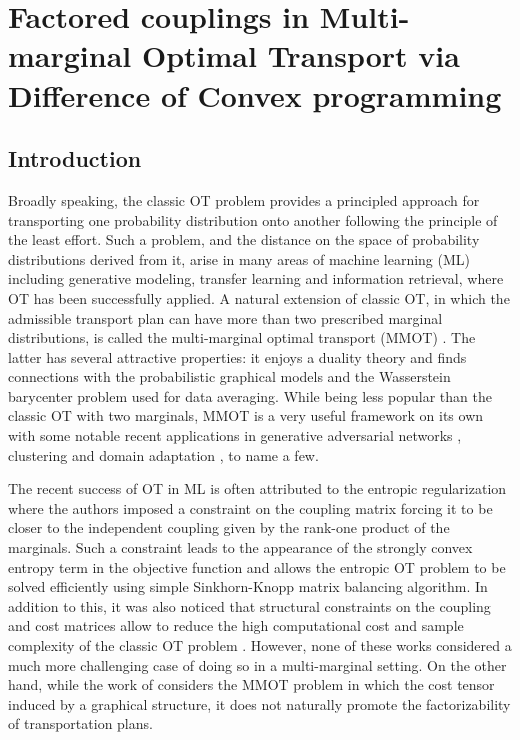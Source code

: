 \section{Factored couplings in Multi-marginal Optimal
Transport via Difference of Convex programming} \label{subsec:MMOT_DC}

\subsection{Introduction}

Broadly speaking, the classic OT problem provides a principled approach for transporting one probability distribution onto another
following the principle of the least effort. Such a problem, and the distance on the space of probability distributions derived from it,
arise in many areas of machine learning (ML) including generative modeling, transfer learning and information retrieval, where OT has
been successfully applied. A natural extension of classic OT, in which the admissible transport plan can have more
than two prescribed marginal distributions, is called the multi-marginal optimal transport (MMOT) \citep{Gangbo98}.
The latter has several attractive properties: it enjoys a duality theory \citep{Kellerer84} and finds connections with the
probabilistic graphical models \citep{Haasler20} and the Wasserstein barycenter problem \citep{Agueh11} used for data averaging.
While being less popular than the classic OT with two marginals, MMOT is a very useful framework on its own with some notable recent
applications in generative adversarial networks \citep{Cao19}, clustering \citep{Mi21} and domain adaptation
\citep{HuiLCHY18,HeZKSC19}, to name a few.

The recent success of OT in ML is often attributed to the entropic regularization \citep{Cuturi13} where the authors imposed a
constraint on the coupling matrix forcing it to be closer to the independent coupling given by the rank-one product of the marginals.
Such a constraint leads to the appearance of the strongly convex entropy term in the objective function and allows the entropic
OT problem to be solved efficiently using simple Sinkhorn-Knopp matrix balancing algorithm. In addition to this, it was also noticed
that structural constraints on the coupling and cost matrices allow to reduce the high computational cost and sample complexity
of the classic OT problem \citep{Genevay19,Forrow18,Chiheng21,Meyer21a}. However, none of these works considered a much more
challenging case of doing so in a multi-marginal setting. On the other hand, while the work of \citet{Haasler20} considers the MMOT
problem in which the cost tensor induced by a graphical structure, it does not naturally promote the factorizability of
transportation plans.

